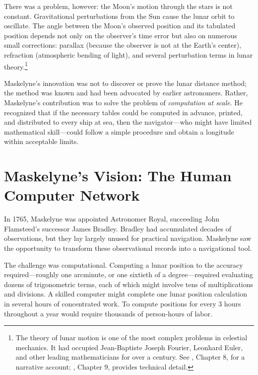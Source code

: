 There was a problem, however: the Moon's motion through the stars is not constant. Gravitational perturbations from the Sun cause the lunar orbit to oscillate. The angle between the Moon's observed position and its tabulated position depends not only on the observer's time error but also on numerous small corrections: parallax (because the observer is not at the Earth's center), refraction (atmospheric bending of light), and several perturbation terms in lunar theory.\footnote{The theory of lunar motion is one of the most complex problems in celestial mechanics. It had occupied Jean-Baptiste Joseph Fourier, Leonhard Euler, and other leading mathematicians for over a century. See \textcite{Sobel1995}, Chapter 8, for a narrative account; \textcite{Chapman1996}, Chapter 9, provides technical detail.}

Maskelyne's innovation was not to discover or prove the lunar distance method; the method was known and had been advocated by earlier astronomers. Rather, Maskelyne's contribution was to solve the problem of \textit{computation at scale}. He recognized that if the necessary tables could be computed in advance, printed, and distributed to every ship at sea, then the navigator—who might have limited mathematical skill—could follow a simple procedure and obtain a longitude within acceptable limits.

\section{Maskelyne's Vision: The Human Computer Network}

In 1765, Maskelyne was appointed Astronomer Royal, succeeding John Flamsteed's successor James Bradley. Bradley had accumulated decades of observations, but they lay largely unused for practical navigation. Maskelyne saw the opportunity to transform these observational records into a navigational tool.

The challenge was computational. Computing a lunar position to the accuracy required—roughly one arcminute, or one sixtieth of a degree—required evaluating dozens of trigonometric terms, each of which might involve tens of multiplications and divisions. A skilled computer might complete one lunar position calculation in several hours of concentrated work. To compute positions for every 3 hours throughout a year would require thousands of person-hours of labor.

